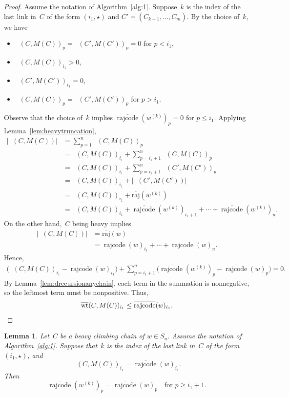 \documentclass[10pt,a4paper]{amsart}
\newcommand{\absoverrajcode}[1]{\overline{\mathrm{raj}}(#1)}
\DeclareMathOperator{\dwt}{\overline{\mathrm{wt}}}
\DeclareMathOperator{\rr}{\mathrm{rajcode}}
\newcommand{\orr}{\overline{\rr}}
\newtheorem{lemma}[theorem]{Lemma}
\begin{document}
\begin{proof}
	Assume the notation of Algorithm~\ref{alg:1}. Suppose~$k$ is the index of the last link in~$C$ of the form $(i_1,\star)$ and $C'=(C_{k+1},\ldots,C_m)$.
	By the choice of~$k$, we have
	\begin{itemize}
		\item $\dwt(C,M(C))_p=\dwt(C',M(C'))_p=0$ for $p<i_1$,
		\item $\dwt(C,M(C))_{i_1} >0$,
		\item $\dwt(C',M(C'))_{i_1} =0$,
		\item $\dwt(C,M(C))_p=\dwt(C',M(C'))_p$ for $p>i_1$.
	\end{itemize}
	Observe that the choice of~$k$ implies $\orr(w^{(k)})_{p}=0$ for $p\leq i_1$. Applying Lemma~\ref{lem:heavytruncation},
	\begin{align*}
		\left|\dwt(C,M(C))\right| &= \sum_{p=1}^{n}\dwt(C,M(C))_p \\
		&= \dwt(C,M(C))_{i_1} + \sum_{p=i_1+1}^{n}\dwt(C,M(C))_{p} \\
		&= \dwt(C,M(C))_{i_1} + \sum_{p=i_1+1}^{n}\dwt(C',M(C'))_{p} \\
		&= \dwt(C,M(C))_{i_1} + \left|\dwt(C',M(C'))\right| \\
		&= \dwt(C,M(C))_{i_1} +\absoverrajcode{w^{(k)}} \\
		&= \dwt(C,M(C))_{i_1} +\orr(w^{(k)})_{i_1+1}+\cdots +\orr(w^{(k)})_n.
	\end{align*}
	On the other hand,~$C$ being heavy implies
	\begin{align*}
		\left|\dwt(C,M(C))\right| &= \absoverrajcode{w}\\
		&= \orr(w)_{i_1}+\cdots+\orr(w)_n.
	\end{align*}
	Hence,
	\begin{align}
		\label{eqn:1}
		\biggr(\dwt(C,M(C))_{i_1}-\orr(w)_{i_1}\biggr)+\sum_{p=i_1+1}^{n} \biggr(\orr(w^{(k)})_{p} -\orr(w)_{p}\biggr)=0.
	\end{align}
	By Lemma~\ref{lem:drecursionanychain}, each term in the summation is nonnegative, so the leftmost term must be nonpositive. Thus,
	\[\dwt(C,M(C))_{i_1}\leq \orr(w)_{i_1}.\qedhere \] 
\end{proof}

\setcounter{section}{9}\setcounter{theorem}{4}
\begin{lemma}
	\label{lem:heavyequalitycase}
	Let~$C$ be a heavy climbing chain of $w\in S_n$. Assume the notation of Algorithm~\ref{alg:1}. 
	Suppose that~$k$ is the index of the last link in~$C$ of the form $(i_1,\star)$, and
	\[\dwt(C,M(C))_{i_1}= \orr(w)_{i_1}. \]
	Then
	\[
	\orr(w^{(k)})_p = \orr(w)_p \quad\mbox{for } p\geq i_1+1. 
	\]
\end{lemma}
\end{document}
